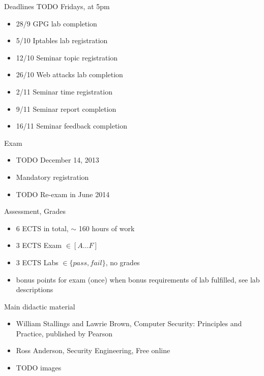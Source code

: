 \documentclass{beamer}
\newcommand{\todo}[1]{\alert{TODO #1}}
\begin{document}
\begin{frame}{Deadlines}
  \todo{Fridays, at 5pm}
  \begin{itemize}
  \item 28/9 GPG lab completion 
  \item 5/10 Iptables lab registration 
  \item 12/10 Seminar topic registration 
  \item 26/10 Web attacks lab completion 
  \item 2/11 Seminar time registration 
  \item 9/11 Seminar report completion 
  \item 16/11 Seminar feedback completion 
  \end{itemize}
\end{frame}

\begin{frame}{Exam}
  \begin{itemize}
  \item \todo{December 14, 2013}
  \item \alert{Mandatory} registration 
  \item \todo{Re-exam in June 2014}
  \end{itemize}
\end{frame}

\begin{frame}{Assessment, Grades}
  \begin{itemize}
  \item 6 ECTS in total, $\sim$ 160 hours of work 
  \item 3 ECTS Exam $\in [A \dots F]$
  \item 3 ECTS Labs $\in \{pass,fail\}$, no grades
  \item bonus points for exam (once) when bonus 
    requirements of lab fulfilled, see lab descriptions
  \end{itemize}
\end{frame}

\begin{frame}{Main didactic material}
  \begin{itemize}
  \item William Stallings and Lawrie Brown, Computer Security:
    Principles and Practice, published by Pearson 
  \item Ross Anderson, Security Engineering, Free online
  \item \todo{images}
  \end{itemize}
\end{frame}
\end{document}
